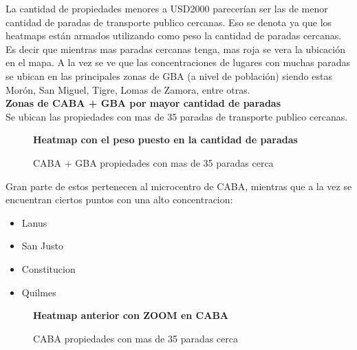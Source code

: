 \documentclass[a4paper, 10pt]{article}
\begin{document}
				
				La cantidad de propiedades menores a \textdollar USD2000 parecerían ser las de menor 
				cantidad de paradas de transporte publico cercanas. Eso se denota ya que los heatmaps 
				están armados utilizando como peso la cantidad de paradas cercanas. Es decir que 
				mientras mas paradas cercanas tenga, mas roja se vera la ubicación en el mapa. 
				A la vez se ve que las concentraciones de lugares con muchas paradas se ubican en 
				las principales zonas de GBA (a nivel de población) siendo estas Morón, 
				San Miguel, Tigre, Lomas de Zamora, entre otras.\\
				
				\textbf{Zonas de CABA + GBA por mayor cantidad de paradas}\\
				Se ubican las propiedades con mas de 35 paradas de transporte publico cercanas.
				
				\begin{figure}[H]
    				\centering
    				\textbf{Heatmap con el peso puesto en la cantidad de paradas}\par\medskip
    				\caption{CABA + GBA propiedades con mas de 35 paradas cerca}
				\end{figure}
								
				
				Gran parte de estos pertenecen al microcentro de CABA, mientras que a la vez se 
				encuentran ciertos puntos con una alto concentracion:
				\begin{itemize}
					\item Lanus
					\item San Justo
					\item Constitucion
					\item Quilmes
				\end{itemize}
				\begin{figure}[H]
    				\centering
    				\textbf{Heatmap anterior con ZOOM en CABA}\par\medskip
    				\caption{CABA propiedades con mas de 35 paradas cerca}
				\end{figure}
\end{document}
